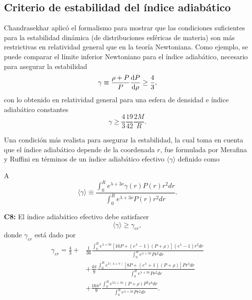 \subsection*{Criterio de estabilidad del índice adiabático }

Chandrasekhar aplicó el formalismo para mostrar que las condiciones suficientes para la estabilidad dinámica (de distribuciones esféricas de materia) son más restrictivas en relatividad general que en la teoría Newtoniana. Como ejemplo, se puede comparar el límite inferior Newtoniano para el índice adiabático, necesario para asegurar la  estabilidad
\begin{equation}
    \gamma \equiv \frac { \rho + P  } { P } \dv{P}{\rho} \geq \frac{4}{3},
\end{equation}
con lo obtenido en relatividad general para una esfera de densidad e índice adiabático constantes
\begin{equation}
    \gamma \geq \frac{4}{3}  \frac{19}{42} \frac{2M}{R}.
\end{equation}

Una condición más realista para asegurar la estabilidad, la cual toma en cuenta que el índice adiabático depende de la coordenada $r$, fue formulada por Merafina y Ruffini \cite{Merafina1989} en términos de un índice adiabático efectivo $\langle\gamma\rangle$ definido como

A\begin{equation}
    \langle\gamma\rangle\equiv\frac{\int_{0}^{R} e^{\lambda+3 \nu} \gamma(r) P(r) r^{2} d r}{\int_{0}^{R} e^{\lambda+3 \nu} P(r) r^{2} d r}.
\end{equation}

\textbf{C8:} El índice adiabático efectivo debe satisfacer
\begin{equation}
     \langle\gamma\rangle \geq \gamma_{cr},
\end{equation}
donde $\gamma_{cr}$ está dado por
\begin{align}
    \gamma_{cr} = \frac{4}{3} +& \frac{1}{36} \frac{\int_{0}^{R} e^{\lambda+3 \mathrm{v}}\left[16 P+\left(e^{\lambda}-1\right)\left(P+\rho \right)\right]\left(e^{\lambda}-1\right) r^{2} d r}{\int_{0}^{R} e^{\lambda+3 \mathrm{v}} P r^{2} d r} \nonumber
    \\ &+ \frac{4 \pi}{9} \frac{\int_{0}^{R} e^{3( \lambda+ \mathrm{v})}\left[8 P+\left(e^{\lambda}+1\right)\left(P+\rho \right)\right] P r^{4} d r}{\int_{0}^{R} e^{\lambda+3 \mathrm{v}} P r^{2} d r}
    \\ & + \frac{16 \pi^{2} }{9} \frac{\int_{0}^{R} e^{5 \lambda+3 v }\left(P+\rho \right) P^{2} r^{6} d r}{\int_{0}^{R} e^{\lambda+3 v } P r^{2} d r}. \nonumber
\end{align}

